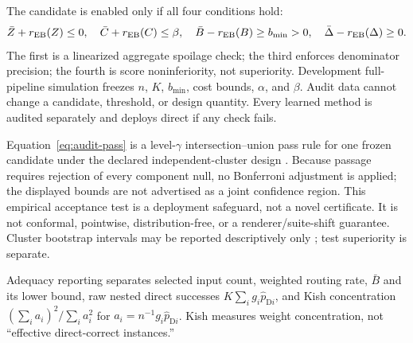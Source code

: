 \documentclass{article}
\newcommand{\D}{\ensuremath{\mathrm{D}}}
\newcommand{\1}{\mathbb{I}}
\begin{document}
The candidate is enabled only if all four conditions hold:
\begin{equation}
 \bar Z+r_{\rm EB}(Z)\leq0,\quad
 \bar C+r_{\rm EB}(C)\leq\beta,\quad
 \bar B-r_{\rm EB}(B)\geq b_{\min}>0,\quad
 \bar\Delta-r_{\rm EB}(\Delta)\geq0.
 \label{eq:audit-pass}
\end{equation}
The first is a linearized aggregate spoilage check; the third enforces denominator precision; the fourth is score noninferiority, not superiority. Development full-pipeline simulation freezes $n$, $K$, $b_{\min}$, cost bounds, $\alpha$, and $\beta$. Audit data cannot change a candidate, threshold, or design quantity. Every learned method is audited separately and deploys direct if any check fails.

Equation~\ref{eq:audit-pass} is a level-$\gamma$ intersection--union pass rule for one frozen candidate under the declared independent-cluster design \citep{berger1996bioequivalence}. Because passage requires rejection of every component null, no Bonferroni adjustment is applied; the displayed bounds are not advertised as a joint confidence region. This empirical acceptance test is a deployment safeguard, not a novel certificate. It is not conformal, pointwise, distribution-free, or a renderer/suite-shift guarantee. Cluster bootstrap intervals may be reported descriptively only \citep{field2007bootstrapping}; test superiority is separate.

Adequacy reporting separates selected input count, weighted routing rate, $\bar B$ and its lower bound, raw nested direct successes $K\sum_i g_i\widehat p_{\D i}$, and Kish concentration $(\sum_i a_i)^2/\sum_i a_i^2$ for $a_i=n^{-1}g_i\widehat p_{\D i}$. Kish measures weight concentration, not ``effective direct-correct instances.''
\end{document}

